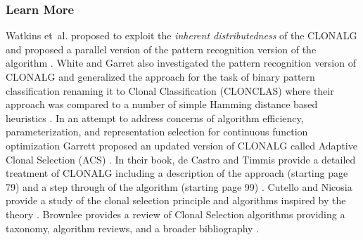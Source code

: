 % 
% 
\subsubsection{Learn More}
Watkins et~al. proposed to exploit the \emph{inherent distributedness} of the CLONALG and proposed a parallel version of the pattern recognition version of the algorithm \cite{Watkins2003}.
White and Garret also investigated the pattern recognition version of CLONALG and generalized the approach for the task of binary pattern classification renaming it to Clonal Classification (CLONCLAS) where their approach was compared to a number of simple Hamming distance based heuristics \cite{White2003}.
In an attempt to address concerns of algorithm efficiency, parameterization, and representation selection for continuous function optimization Garrett proposed an updated version of CLONALG called Adaptive Clonal Selection (ACS) \cite{Garrett2004}.
In their book, de Castro and Timmis provide a detailed treatment of CLONALG including a description of the approach (starting page 79) and a step through of the algorithm (starting page 99) \cite{Castro2002b}.
Cutello and Nicosia provide a study of the clonal selection principle and algorithms inspired by the theory \cite{Cutello2005}.
Brownlee provides a review of Clonal Selection algorithms providing a taxonomy, algorithm reviews, and a broader bibliography \cite{Brownlee2007b}.

